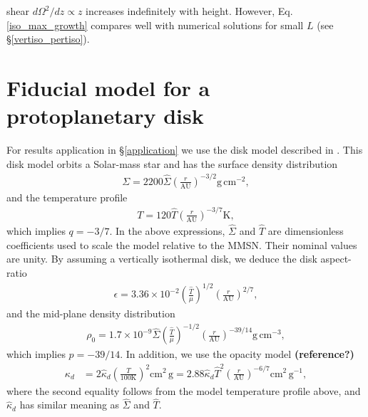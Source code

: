 shear $d\Omega^2/dz\propto z$ increases indefinitely with 
height. However, Eq. \ref{iso_max_growth} compares well with
numerical solutions for small $L$ (see \S\ref{vertiso_pertiso}). 





























\section{Fiducial model for a protoplanetary disk}\label{mmsn}
For results application in \S\ref{application} we use the disk model
described in \cite{chiang10}. This disk model orbits a Solar-mass star and 
has the surface density distribution
\begin{align}\label{mmsn_sigma}
  \Sigma = 2200
  \hat{\Sigma}\left(\frac{r}{\mathrm{AU}}\right)^{-3/2}\mathrm{g}\,\mathrm{cm}^{-2},  
\end{align}
and the temperature profile
\begin{align}\label{mmsn_temp}
  T = 120\hat{T}\left(\frac{r}{\mathrm{AU}}\right)^{-3/7} \mathrm{K},
\end{align}
which implies $q=-3/7$. In the above expressions, $\hat{\Sigma}$ and
$\hat{T}$ are dimensionless coefficients used to scale the model
relative to the MMSN. Their nominal values are unity. By assuming a
vertically isothermal disk, we deduce the disk aspect-ratio 
\begin{align}\label{mmsn_epsilon}
  \epsilon =
  3.36\times10^{-2}\left(\frac{\hat{T}}{\mu}\right)^{1/2}\left(\frac{r}{\mathrm{AU}}\right)^{2/7}, 
\end{align}
and the mid-plane density distribution 
\begin{align}
\rho_0 = 1.7\times10^{-9}
  \hat{\Sigma}\left(\frac{\hat{T}}{\mu}\right)^{-1/2}\left(\frac{r}{\mathrm{AU}}\right)^{-39/14}\mathrm{g}\,\mathrm{cm}^{-3},
\end{align}
which implies $p=-39/14$. 
In addition, we
use the opacity model {\bf(reference?)}
 \begin{align}
   \kappa_d &= 2 \hat{\kappa}_d \left(\frac{T}{100\mathrm{K}}\right)^2
   \mathrm{cm}^2\,\mathrm{g}
    =
   2.88\hat{\kappa}_d\hat{T}^2\left(\frac{r}{\mathrm{AU}}\right)^{-6/7}\mathrm{cm}^2\,\mathrm{g}^{-1},   
 \end{align}
where the second equality follows from the model temperature profile
above, and $\hat{\kappa}_d$ has similar meaning as $\hat{\Sigma}$ and
$\hat{T}$. 
